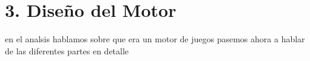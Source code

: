 \chapter*{3. Diseño del Motor}\label{cap:design}

en el analsis hablamos sobre que era un motor de juegos pasemos ahora a hablar de las diferentes partes en detalle






